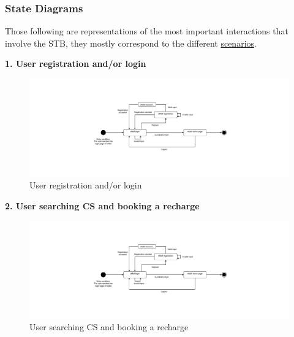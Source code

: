 \documentclass[11pt]{article}
\begin{document}
\newpage

\subsubsection{State Diagrams}

Those following are representations of the most important interactions that involve the STB, they mostly correspond to the different \hyperref[subsubsec:scenarios]{scenarios}.

\begin{description}
    \item \textbf{1. User registration and/or login}
    \begin{figure}[!ht]
        \includegraphics[page={1}, width=\linewidth, trim=8cm 3cm 8cm 3cm, clip]{StateCharts.pdf}
        \caption{User registration and/or login}
    \end{figure}
    
    \item \textbf{2. User searching CS and booking a recharge}
    \begin{figure}[!ht]
        \includegraphics[page={2}, width=\linewidth, trim=2cm 4cm 2cm 4cm, clip]{StateCharts.pdf}
        \caption{User searching CS and booking a recharge}
    \end{figure}
    

\end{description}
\end{document}
